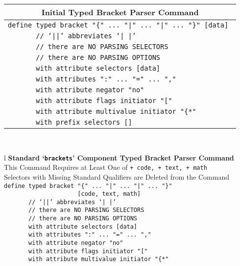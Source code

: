 \documentclass[12pt]{article}
\makeatletter
\newcommand{\TT}[1]{{\tt \bfseries #1}}
\newcommand{\ttkey}[1]{\TT{#1}\index{#1@\TT{#1}}}
\makeatother
\begin{document}
\begin{center}\label{TOP-LEVEL-{}}
\begin{tabular}{l}
\multicolumn{1}{c}{\bf Initial Typed Bracket Parser Command}
\\\hline
\tt define typed bracket "\{" ... "|" ... "|" ... "\}" [data] \\
\tt ~~~~~~~// `||' abbreviates `| |' \\
\tt ~~~~~~~// there are NO PARSING SELECTORS \\
\tt ~~~~~~~// there are NO PARSING OPTIONS \\
\tt ~~~~~~~with attribute selectors [data] \\
\tt ~~~~~~~with attributes ":" ... "=" ... "," \\
\tt ~~~~~~~with attribute negator "no" \\
\tt ~~~~~~~with attribute flags initiator "[" \\
\tt ~~~~~~~with attribute multivalue initiator "\{*" \\
\tt ~~~~~~~with prefix selectors [] \\
\end{tabular}
\\[2ex]
\begin{tabular}{l}
{\bf Standard `\ttkey{brackets}'\label{STANDARD-BRACKETS-2} Component
     Typed Bracket Parser Command}
\\[1ex]
{This Command Requires at Least One of {\tt + code, + text, + math}} \\
{Selectors with Missing Standard Qualifiers are Deleted from the Command}
\\[1ex]
\tt define typed bracket "\{" ... "|" ... "|" ... "\}" \\
\tt ~~~~~~~~~~~~~~~~~~~~~[code, text, math] \\
\tt ~~~~~~~// `||' abbreviates `| |' \\
\tt ~~~~~~~// there are NO PARSING SELECTORS \\
\tt ~~~~~~~// there are NO PARSING OPTIONS \\
\tt ~~~~~~~with attribute selectors [data] \\
\tt ~~~~~~~with attributes ":" ... "=" ... "," \\
\tt ~~~~~~~with attribute negator "no" \\
\tt ~~~~~~~with attribute flags initiator "[" \\
\tt ~~~~~~~with attribute multivalue initiator "\{*" \\
\end{tabular}
\end{center}
\end{document}
